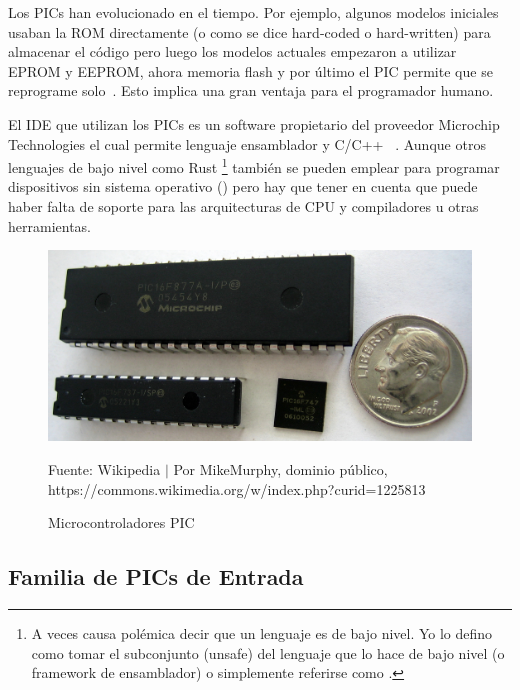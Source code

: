 \documentclass[conference]{IEEEtran}
\begin{document}
    Los PICs han evolucionado en el tiempo. Por ejemplo, algunos modelos
    iniciales usaban la ROM directamente (o como se dice hard-coded o
    hard-written) para almacenar el código pero luego los modelos actuales
    empezaron a utilizar EPROM y EEPROM, ahora memoria flash y por último el
    PIC permite que se reprograme solo~\cite{wikipedia-pic-2022}. Esto
    implica una gran ventaja para el programador humano.

    \bigbreak

    El IDE que utilizan los PICs es un software propietario del proveedor
    Microchip Technologies el cual permite lenguaje ensamblador y C/C++~\cite{microchip-technology-inc-2013,wikipedia-pic-2022} . Aunque
    otros lenguajes de bajo nivel como Rust \footnote{A veces causa polémica
    decir que un lenguaje es de bajo nivel. Yo lo defino como tomar el
    subconjunto (unsafe) del lenguaje que lo hace de bajo nivel (o framework
    de ensamblador) o simplemente referirse como .} también se pueden emplear para programar dispositivos sin
    sistema operativo () pero hay que tener en cuenta que puede
    haber falta de soporte para las arquitecturas de CPU y compiladores u
    otras herramientas.

    \bigbreak

    \begin{figure}[H]
        \centering
        \includegraphics[width=0.3\paperwidth]{images/pic-microcontrollers}
        \caption{Microcontroladores PIC} \footnotesize
        Fuente: Wikipedia $\mid$ Por MikeMurphy, dominio público,
        https://commons.wikimedia.org/w/index.php?curid=1225813~\cite{wikipedia-pic-2022}\label{fig:figure}
    \end{figure}

    \subsection{Familia de PICs de Entrada}\label{subsec:familia-de-pics-de
    -entrada}
\end{document}
